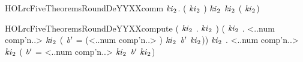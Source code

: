 \newcommand{\HOLrcFiveTheoremsLkeysSupXXcompute}{\UseVerbatim{HOLrcFiveTheoremsLkeysSupXXcompute}}
\begin{SaveVerbatim}{HOLrcFiveTheoremsRoundDeYYXXcomm}
\HOLTokenTurnstile{} \HOLSymConst{\HOLTokenForall{}}    \ensuremath{\HOLBoundVar{ki}\sb{\mathrm{2}}}.
      (   \ensuremath{\HOLBoundVar{ki}\sb{\mathrm{2}}} )  \ensuremath{\HOLBoundVar{ki}\sb{\mathrm{2}}} \HOLSymConst{=}
        \ensuremath{\HOLBoundVar{ki}\sb{\mathrm{2}}} (   \ensuremath{\HOLBoundVar{ki}\sb{\mathrm{2}}})
\end{SaveVerbatim}
\newcommand{\HOLrcFiveTheoremsRoundDeYYXXcomm}{\UseVerbatim{HOLrcFiveTheoremsRoundDeYYXXcomm}}
\begin{SaveVerbatim}{HOLrcFiveTheoremsRoundDeYYXXcompute}
\HOLTokenTurnstile{} (\HOLSymConst{\HOLTokenForall{}} \ensuremath{\HOLBoundVar{ki}\sb{\mathrm{2}}} .    \ensuremath{\HOLBoundVar{ki}\sb{\mathrm{2}}}  \HOLSymConst{=} ) \HOLSymConst{\HOLTokenConj{}}
   (\HOLSymConst{\HOLTokenForall{}}  \ensuremath{\HOLBoundVar{ki}\sb{\mathrm{2}}} .
       <..num comp'n..>  \ensuremath{\HOLBoundVar{ki}\sb{\mathrm{2}}}  \HOLSymConst{=}
      (
         \ensuremath{\HOLBoundVar{b}\sp{\prime{}}} =  (<..num comp'n..> \HOLSymConst{\ensuremath{-}} )  \ensuremath{\HOLBoundVar{ki}\sb{\mathrm{2}}} 
          \ensuremath{\HOLBoundVar{b}\sp{\prime{}}}  \ensuremath{\HOLBoundVar{ki}\sb{\mathrm{2}}})) \HOLSymConst{\HOLTokenConj{}}
   \HOLSymConst{\HOLTokenForall{}}  \ensuremath{\HOLBoundVar{ki}\sb{\mathrm{2}}} .
      <..num comp'n..>  \ensuremath{\HOLBoundVar{ki}\sb{\mathrm{2}}}  \HOLSymConst{=}
     (
        \ensuremath{\HOLBoundVar{b}\sp{\prime{}}} =  <..num comp'n..>  \ensuremath{\HOLBoundVar{ki}\sb{\mathrm{2}}} 
         \ensuremath{\HOLBoundVar{b}\sp{\prime{}}}  \ensuremath{\HOLBoundVar{ki}\sb{\mathrm{2}}})
\end{SaveVerbatim}
